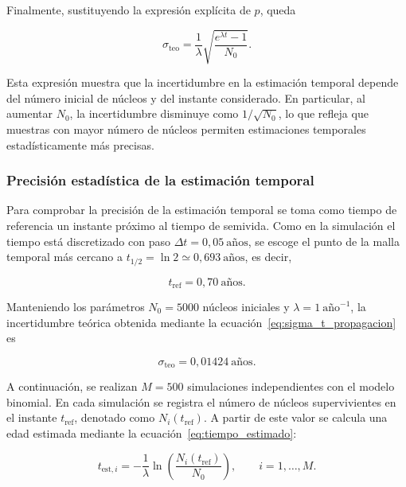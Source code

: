 \documentclass[12pt,a4paper]{article}
\begin{document}
Finalmente, sustituyendo la expresión explícita de $p$, queda

\begin{equation}
\sigma_{\mathrm{teo}}=
\frac{1}{\lambda}
\sqrt{
\frac{e^{\lambda t}-1}{N_0}
}.
\label{eq:sigma_t_propagacion}
\end{equation}

Esta expresión muestra que la incertidumbre en la estimación temporal depende del número inicial de núcleos y del instante considerado. En particular, al aumentar $N_0$, la incertidumbre disminuye como $1/\sqrt{N_0}$, lo que refleja que muestras con mayor número de núcleos permiten estimaciones temporales estadísticamente más precisas.

\subsubsection{Precisión estadística de la estimación temporal}

Para comprobar la precisión de la estimación temporal se toma como tiempo de referencia un instante próximo al tiempo de semivida. Como en la simulación el tiempo está discretizado con paso $\Delta t=0{,}05~\text{años}$, se escoge el punto de la malla temporal más cercano a $t_{1/2}=\ln 2\simeq 0{,}693~\text{años}$, es decir,

\begin{equation}
t_{\mathrm{ref}} = 0{,}70~\text{años}.
\end{equation}

Manteniendo los parámetros $N_0=5000$ núcleos iniciales y $\lambda=1~\text{año}^{-1}$, la incertidumbre teórica obtenida mediante la ecuación~\eqref{eq:sigma_t_propagacion} es

\begin{equation}
\sigma_{\mathrm{teo}} = 0{,}01424~\text{años}.
\end{equation}

A continuación, se realizan $M=500$ simulaciones independientes con el modelo binomial. En cada simulación se registra el número de núcleos supervivientes en el instante $t_{\mathrm{ref}}$, denotado como $N_i(t_{\mathrm{ref}})$. A partir de este valor se calcula una edad estimada mediante la ecuación~\eqref{eq:tiempo_estimado}:

\begin{equation}
t_{\mathrm{est},i}
=-\frac{1}{\lambda}
\ln\left(
\frac{N_i(t_{\mathrm{ref}})}{N_0}
\right),
\qquad i=1,\dots,M.
\end{equation}
\end{document}
